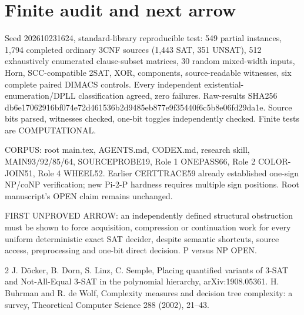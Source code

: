 \documentclass{article}
\begin{document}
\section{Finite audit and next arrow}
Seed 202610231624, standard-library reproducible test: 549 partial instances, 1,794 completed ordinary 3CNF sources (1,443 SAT, 351 UNSAT), 512 exhaustively enumerated clause-subset matrices, 30 random mixed-width inputs, Horn, SCC-compatible 2SAT, XOR, components, source-readable witnesses, six complete paired DIMACS controls. Every independent existential-enumeration/DPLL classification agreed, zero failures. Raw-results SHA256 db6e17062916bf074e72d461536b2d9485eb877e9f35440f6c5b8e06fd29da1e. Source bits parsed, witnesses checked, one-bit toggles independently checked. Finite tests are COMPUTATIONAL.
\par\noindent CORPUS: root main.tex, AGENTS.md, CODEX.md, research skill, MAIN93/92/85/64, SOURCEPROBE19, Role 1 ONEPASS66, Role 2 COLOR-JOIN51, Role 4 WHEEL52. Earlier CERTTRACE59 already established one-sign NP/coNP verification; new Pi-2-P hardness requires multiple sign positions. Root manuscript's OPEN claim remains unchanged.
\par\noindent FIRST UNPROVED ARROW: an independently defined structural obstruction must be shown to force acquisition, compression or continuation work for every uniform deterministic exact SAT decider, despite semantic shortcuts, source access, preprocessing and one-bit direct decision. P versus NP OPEN.
\begin{thebibliography}{2}
 J. D\"ocker, B. Dorn, S. Linz, C. Semple, Placing quantified variants of 3-SAT and Not-All-Equal 3-SAT in the polynomial hierarchy, arXiv:1908.05361.
 H. Buhrman and R. de Wolf, Complexity measures and decision tree complexity: a survey, Theoretical Computer Science 288 (2002), 21--43.
\end{thebibliography}
\end{document}
